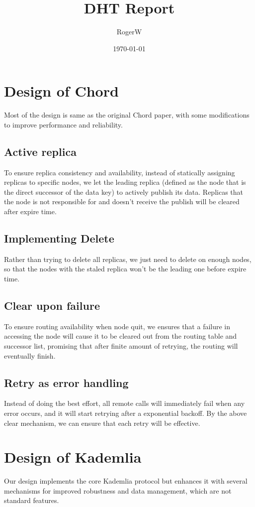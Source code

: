 \documentclass{article}
\title{DHT Report}
\author{RogerW}
\date{\today}
\begin{document}
\maketitle
\section{Design of Chord}
Most of the design is same as the original Chord paper, with some modifications to improve performance and reliability.
\subsection{Active replica}
To ensure replica consistency and availability, instead of statically assigning replicas to specific nodes, we let the leading replica (defined as the node that is the direct successor of the data key) to actively publish its data. Replicas that the node is not responsible for and doesn't receive the publish will be cleared after expire time.
\subsection{Implementing Delete}
Rather than trying to delete all replicas, we just need to delete on enough nodes, so that the nodes with the staled replica won't be the leading one before expire time.
\subsection{Clear upon failure}
To ensure routing availability when node quit, we ensures that a failure in accessing the node will cause it to be cleared out from the routing table and successor list, promising that after finite amount of retrying, the routing will eventually finish.
\subsection{Retry as error handling}
Instead of doing the best effort, all remote calls will immediately fail when any error occurs, and it will start retrying after a exponential backoff. By the above clear mechanism, we can ensure that each retry will be effective.


\section{Design of Kademlia}

Our design implements the core Kademlia protocol but enhances it with several mechanisms for improved robustness and data management, which are not standard features.
\end{document}
